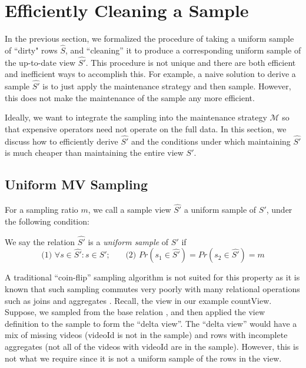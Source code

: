 \section{Efficiently Cleaning a Sample} \label{sampling}
In the previous section, we formalized the procedure of taking a uniform sample of ``dirty" rows $\hat{S}$, and ``cleaning'' it to produce a corresponding uniform sample of the up-to-date view $\hat{S'}$.
This procedure is not unique and there are both efficient and inefficient ways to accomplish this. 
For example, a naive solution to derive a sample $\hat{S'}$ is to just apply the maintenance strategy and then sample.
However, this does not make the maintenance of the sample any more efficient.

Ideally, we want to integrate the sampling into the maintenance strategy $\mathcal{M}$ so that expensive operators
need not operate on the full data.
In this section, we discuss how to efficiently derive $\hat{S'}$ and the conditions under which
maintaining $\hat{S'}$ is much cheaper than maintaining the entire view $S'$.

\subsection{Uniform MV Sampling}
For a sampling ratio $m$, we call a sample view $\hat{S'}$ a uniform sample of $S'$, under the following condition:
\begin{definition} We say the relation $\hat{S'}$ is a \emph{uniform sample} of $S'$ if
\[\text{(1) } \forall s \in \hat{S'} : s \in S'\text{;~~~~~ (2) }Pr(s_1 \in \hat{S'}) =  Pr(s_2 \in \hat{S'}) = m\]
\end{definition}
A traditional ``coin-flip'' sampling algorithm is not suited for this property as it is known that such sampling commutes very poorly with many relational operations such as joins and aggregates \cite{chaudhuri1999random}.
Recall, the view in our example \textsf{countView}. 
Suppose, we sampled from the base relation , and then applied the view definition to the sample to form the ``delta view''.
The ``delta view'' would have a mix of missing videos (\textsf{videoId} is not in the sample) and rows with incomplete aggregates (not all of the videos with \textsf{videoId} are in the sample).
However, this is not what we require since it is not a uniform sample of the rows in the view. 


